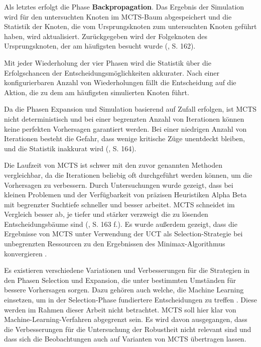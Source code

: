 Als letztes erfolgt die Phase \textbf{Backpropagation}. Das Ergebnis der Simulation wird für den untersuchten Knoten im MCTS-Baum abgespeichert und die Statistik der Knoten, die vom Ursprungsknoten zum untersuchten Knoten geführt haben, wird aktualisiert. Zurückgegeben wird der Folgeknoten des Ursprungsknoten, der am häufigsten besucht wurde (\cite{Russell.2020}, S. 162).

Mit jeder Wiederholung der vier Phasen wird die Statistik über die Erfolgschancen der Entscheidungsmöglichkeiten akkurater. Nach einer konfigurierbaren Anzahl von Wiederholungen fällt die Entscheidung auf die Aktion, die zu dem am häufigsten simulierten Knoten führt.

Da die Phasen Expansion und Simulation basierend auf Zufall erfolgen, ist MCTS nicht deterministisch und bei einer begrenzten Anzahl von Iterationen können keine perfekten Vorhersagen garantiert werden. Bei einer niedrigen Anzahl von Iterationen besteht die Gefahr, dass wenige kritische Züge unentdeckt bleiben, und die Statistik inakkurat wird (\cite{Russell.2020}, S. 164).

Die Laufzeit von MCTS ist schwer mit den zuvor genannten Methoden vergleichbar, da die Iterationen beliebig oft durchgeführt werden können, um die Vorhersagen zu verbessern. Durch Untersuchungen wurde gezeigt, dass bei kleinen Problemen und der Verfügbarkeit von präzisen Heuristiken Alpha Beta mit begrenzter Suchtiefe schneller und besser arbeitet. MCTS schneidet im Vergleich besser ab, je tiefer und stärker verzweigt die zu lösenden Entscheidungsbäume sind (\cite{Russell.2020}, S. 163 f.). Es wurde außerdem gezeigt, dass die Ergebnisse von MCTS unter Verwendung der UCT als Selection-Strategie bei unbegrenzten Ressourcen zu den Ergebnissen des Minimax-Algorithmus konvergieren \cite{Browne.2012}.

Es existieren verschiedene Variationen und Verbesserungen für die Strategien in den Phasen Selection und Expansion, die unter bestimmten Umständen für bessere Vorhersagen sorgen. Dazu gehören auch welche, die Machine Learning einsetzen, um in der Selection-Phase fundiertere Entscheidungen zu treffen \cite{Browne.2012}. Diese werden im Rahmen dieser Arbeit nicht betrachtet. MCTS soll hier klar von Machine-Learning-Verfahren abgegrenzt sein. Es wird davon ausgegangen, dass die Verbesserungen für die Untersuchung der Robustheit nicht relevant sind und dass sich die Beobachtungen auch auf Varianten von MCTS übertragen lassen.
